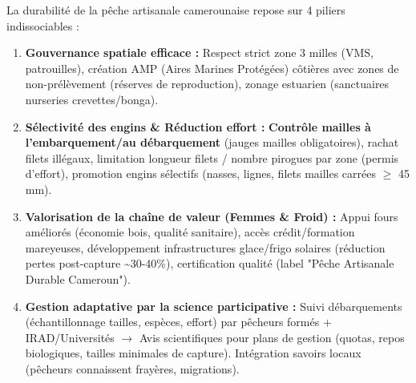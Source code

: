 \documentclass[11pt]{article}
\begin{document}
\begin{aretenir}
La durabilité de la pêche artisanale camerounaise repose sur 4 piliers indissociables :
\begin{enumerate}
\item \textbf{Gouvernance spatiale efficace :} Respect strict zone 3 milles (VMS, patrouilles), création AMP (Aires Marines Protégées) côtières avec zones de non-prélèvement (réserves de reproduction), zonage estuarien (sanctuaires nurseries crevettes/bonga).
\item \textbf{Sélectivité des engins \& Réduction effort :} \textbf{Contrôle mailles à l'embarquement/au débarquement} (jauges mailles obligatoires), rachat filets illégaux, limitation longueur filets / nombre pirogues par zone (permis d'effort), promotion engins sélectifs (nasses, lignes, filets mailles carrées $\ge$ 45 mm).
\item \textbf{Valorisation de la chaîne de valeur (Femmes \& Froid) :} Appui fours améliorés (économie bois, qualité sanitaire), accès crédit/formation mareyeuses, développement infrastructures glace/frigo solaires (réduction pertes post-capture \textasciitilde 30-40\%), certification qualité (label "Pêche Artisanale Durable Cameroun").
\item \textbf{Gestion adaptative par la science participative :} Suivi débarquements (échantillonnage tailles, espèces, effort) par pêcheurs formés + IRAD/Universités $\rightarrow$ Avis scientifiques pour plans de gestion (quotas, repos biologiques, tailles minimales de capture). Intégration savoirs locaux (pêcheurs connaissent frayères, migrations).
\end{enumerate}
\end{aretenir}
\end{document}
